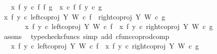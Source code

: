 \begin{isabellebody}
\ \ \ {\isachardoublequoteopen}{\isacharparenleft}{\kern0pt}x\ {\isasymbowtie}\isactrlsub f\ y{\isacharparenright}{\kern0pt}\ {\isasymcirc}\isactrlsub c\ {\isacharparenleft}{\kern0pt}f\ {\isasymbowtie}\isactrlsub f\ g{\isacharparenright}{\kern0pt}\ {\isacharequal}{\kern0pt}\ {\isacharparenleft}{\kern0pt}x\ {\isasymcirc}\isactrlsub c\ f{\isacharparenright}{\kern0pt}\ {\isasymbowtie}\isactrlsub f\ {\isacharparenleft}{\kern0pt}y\ {\isasymcirc}\isactrlsub c\ g{\isacharparenright}{\kern0pt}{\isachardoublequoteclose}\isanewline
%
\isadelimproof
%
\endisadelimproof
%
\isatagproof
{}\isamarkupfalse%
{\isacharminus}{\kern0pt}\ \isanewline
\ \ \isamarkupfalse%
\ {\isachardoublequoteopen}{\isacharparenleft}{\kern0pt}x\ {\isasymbowtie}\isactrlsub f\ y{\isacharparenright}{\kern0pt}\ {\isasymcirc}\isactrlsub c\ {\isacharparenleft}{\kern0pt}{\isacharparenleft}{\kern0pt}left{\isacharunderscore}{\kern0pt}coproj\ Y\ W\ {\isasymcirc}\isactrlsub c\ f{\isacharparenright}{\kern0pt}\ {\isasymamalg}\ {\isacharparenleft}{\kern0pt}right{\isacharunderscore}{\kern0pt}coproj\ Y\ W\ {\isasymcirc}\isactrlsub c\ g{\isacharparenright}{\kern0pt}{\isacharparenright}{\kern0pt}\isanewline
\ \ \ \ \ \ {\isacharequal}{\kern0pt}\ {\isacharparenleft}{\kern0pt}{\isacharparenleft}{\kern0pt}x\ {\isasymbowtie}\isactrlsub f\ y{\isacharparenright}{\kern0pt}\ {\isasymcirc}\isactrlsub c\ left{\isacharunderscore}{\kern0pt}coproj\ Y\ W\ {\isasymcirc}\isactrlsub c\ f{\isacharparenright}{\kern0pt}\ {\isasymamalg}\ {\isacharparenleft}{\kern0pt}{\isacharparenleft}{\kern0pt}x\ {\isasymbowtie}\isactrlsub f\ y{\isacharparenright}{\kern0pt}\ {\isasymcirc}\isactrlsub c\ right{\isacharunderscore}{\kern0pt}coproj\ Y\ W\ {\isasymcirc}\isactrlsub c\ g{\isacharparenright}{\kern0pt}{\isachardoublequoteclose}\isanewline
\ \ \ \ \isamarkupfalse%
\ assms\ \isamarkupfalse%
\ {\isacharparenleft}{\kern0pt}typecheck{\isacharunderscore}{\kern0pt}cfuncs{\isacharcomma}{\kern0pt}\ simp\ add{\isacharcolon}{\kern0pt}\ cfunc{\isacharunderscore}{\kern0pt}coprod{\isacharunderscore}{\kern0pt}comp{\isacharparenright}{\kern0pt}\isanewline
\ \ \isamarkupfalse%
\ \isamarkupfalse%
\ {\isachardoublequoteopen}{\isachardot}{\kern0pt}{\isachardot}{\kern0pt}{\isachardot}{\kern0pt}\ {\isacharequal}{\kern0pt}\ {\isacharparenleft}{\kern0pt}{\isacharparenleft}{\kern0pt}{\isacharparenleft}{\kern0pt}x\ {\isasymbowtie}\isactrlsub f\ y{\isacharparenright}{\kern0pt}\ {\isasymcirc}\isactrlsub c\ left{\isacharunderscore}{\kern0pt}coproj\ Y\ W{\isacharparenright}{\kern0pt}\ {\isasymcirc}\isactrlsub c\ f{\isacharparenright}{\kern0pt}\ {\isasymamalg}\ {\isacharparenleft}{\kern0pt}{\isacharparenleft}{\kern0pt}{\isacharparenleft}{\kern0pt}x\ {\isasymbowtie}\isactrlsub f\ y{\isacharparenright}{\kern0pt}\ {\isasymcirc}\isactrlsub c\ right{\isacharunderscore}{\kern0pt}coproj\ Y\ W{\isacharparenright}{\kern0pt}\ {\isasymcirc}\isactrlsub c\ g{\isacharparenright}{\kern0pt}{\isachardoublequoteclose}\isanewline

\end{isabellebody}
